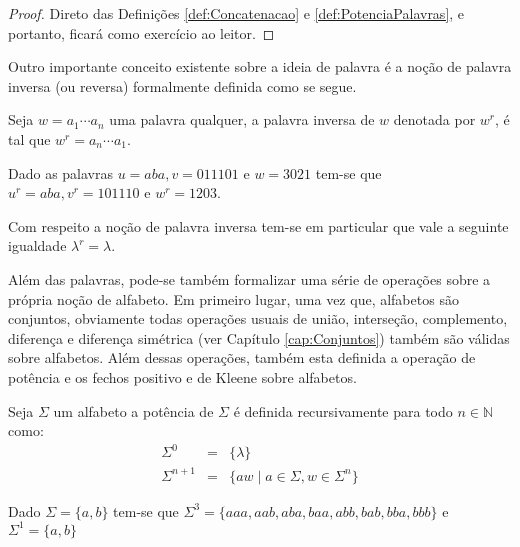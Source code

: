 \begin{proof}
	Direto das Definições \ref{def:Concatenacao} e \ref{def:PotenciaPalavras}, e portanto, ficará como exercício ao leitor.
\end{proof}

Outro importante conceito existente sobre a ideia de palavra é a noção de palavra inversa (ou reversa) formalmente definida como se segue.

\begin{definition}\label{def:PalavraInversa}
	\cite{valdi2016master} Seja $w = a_1\cdots a_n$ uma palavra qualquer, a palavra inversa de $w$ denotada por $w^r$, é tal que $w^r = a_n\cdots a_1$. 
\end{definition}

\begin{example}
	Dado as palavras $u = aba, v = 011101$ e $w = 3021$ tem-se que $u^r = aba, v^r = 101110$ e $w^r = 1203$.
\end{example}

\begin{remark}
	Com respeito a noção de palavra inversa tem-se em particular que vale a seguinte igualdade $\lambda^r = \lambda$.
\end{remark}

Além das palavras, pode-se também formalizar uma série de operações sobre a própria noção de alfabeto. Em primeiro lugar, uma vez que,  alfabetos são conjuntos, obviamente todas operações usuais de união, interseção, complemento, diferença e diferença simétrica (ver Capítulo \ref{cap:Conjuntos}) também são válidas sobre alfabetos. Além dessas operações, também esta definida a operação de potência e os fechos positivo e de Kleene sobre alfabetos.

\begin{definition}\label{def:PotenciaAlfabeto}
	\cite{benjaLivro2010} Seja $\Sigma$ um alfabeto a potência de $\Sigma$ é definida recursivamente para todo $n \in \mathbb{N}$ como:
	\begin{eqnarray}
		\Sigma^0 & = & \{\lambda\}\\
		\Sigma^{n+1} & = & \{aw \mid a \in \Sigma, w \in \Sigma^{n}\}
	\end{eqnarray}
\end{definition} 

\begin{example}
	Dado $\Sigma = \{a, b\}$ tem-se que $\Sigma^3 = \{aaa, aab, aba, baa, abb, bab, bba, bbb\}$ e $\Sigma^1 = \{a, b\}$
\end{example}

